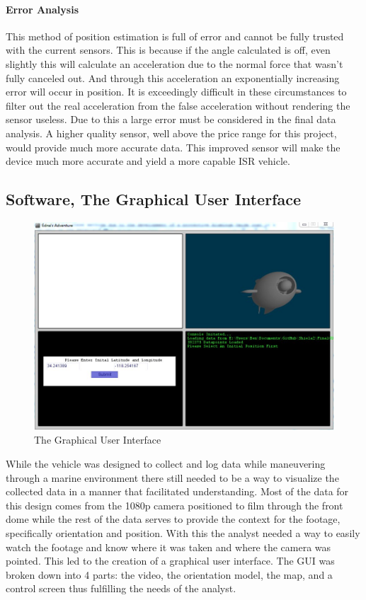 \documentclass{report}
\begin{document}
\paragraph{Error Analysis} 
This method of position estimation is full of error and cannot be fully trusted with the current sensors. This is because if the angle calculated is off, even slightly this will calculate an acceleration due to the normal force that wasn't fully canceled out. And through this acceleration an exponentially increasing error will occur in position. It is exceedingly difficult in these circumstances to filter out the real acceleration from the false acceleration without rendering the sensor useless. Due to this a large error must be considered in the final data analysis. A higher quality sensor, well above the price range for this project, would provide much more accurate data. This improved sensor will make the device much more accurate and yield a more capable ISR vehicle. 
\subsection{Software, The Graphical User Interface}
\begin{figure}
\centering
\includegraphics[width=12cm]{gui}
\caption{The Graphical User Interface}
\end{figure}
While the vehicle was designed to collect and log data while maneuvering through a marine environment there still needed to be a way to visualize the collected data in a manner that facilitated understanding. Most of the data for this design comes from the 1080p camera positioned to film through the front dome while the rest of the data serves to provide the context for the footage, specifically orientation and position. With this the analyst needed a way to easily watch the footage and know where it was taken and where the camera was pointed. This led to the creation of a graphical user interface. The GUI was broken down into 4 parts: the video, the orientation model, the map, and a control screen thus fulfilling the needs of the analyst.
\end{document}
